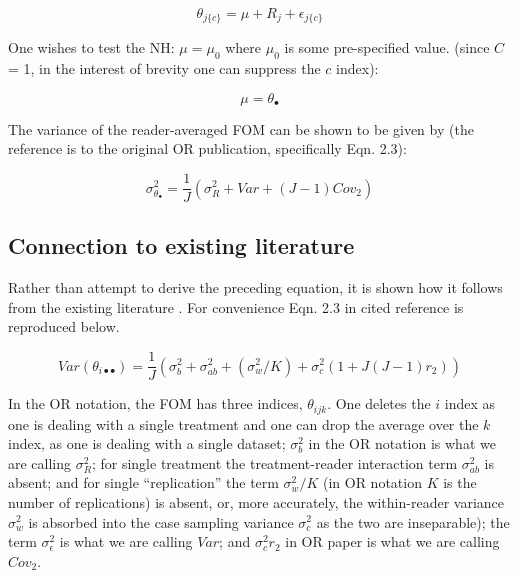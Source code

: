 \documentclass[
]{book}
\begin{document}
\begin{equation}
\theta_{j\{c\}}=\mu+R_j+\epsilon_{j\{c\}}
\label{eq:OrModel1T}
\end{equation}

One wishes to test the NH: \(\mu=\mu_0\) where \(\mu_0\) is some pre-specified value. (since \(C\) = 1, in the interest of brevity one can suppress the \(c\) index):

\begin{equation}
\mu=\theta_{\bullet}
\label{eq:OrModel1REstmu}
\end{equation}

The variance of the reader-averaged FOM can be shown \citep{RN1450} to be given by (the reference is to the original OR publication, specifically Eqn. 2.3):

\begin{equation}
\sigma_{\theta_{\bullet}}^{2}=\frac{1}{J}(\sigma_{R}^{2}+Var+(J-1)Cov_2)
\label{eq:VarThetaiDot}
\end{equation}

\hypertarget{connection-to-existing-literature}{%
\subsection{Connection to existing literature}\label{connection-to-existing-literature}}

Rather than attempt to derive the preceding equation, it is shown how it follows from the existing literature \citep{RN1450}. For convenience Eqn. 2.3 in cited reference is reproduced below.

\begin{equation}
Var(\theta_{i \bullet \bullet}) =\frac{1}{J}(\sigma_{b}^{2}+\sigma_{ab}^{2}+(\sigma_{w}^{2}/K) + \sigma_{c}^{2}(1+J(J-1)r_2))
\label{eq:VarThetaiDotDot}
\end{equation}

In the OR notation, the FOM has three indices, \(\theta_{ijk}\). One deletes the \(i\) index as one is dealing with a single treatment and one can drop the average over the \(k\) index, as one is dealing with a single dataset; \(\sigma_{b}^{2}\) in the OR notation is what we are calling \(\sigma_{R}^{2}\); for single treatment the treatment-reader interaction term \(\sigma_{ab}^{2}\) is absent; and for single ``replication'' the term \(\sigma_{w}^{2}/K\) (in OR notation \(K\) is the number of replications) is absent, or, more accurately, the within-reader variance \(\sigma_{w}^{2}\) is absorbed into the case sampling variance \(\sigma_{c}^{2}\) as the two are inseparable); the term \(\sigma_{\epsilon}^{2}\) is what we are calling \(Var\); and \(\sigma_{c}^{2}r_2\) in OR paper is what we are calling \(Cov_2\).
\end{document}
